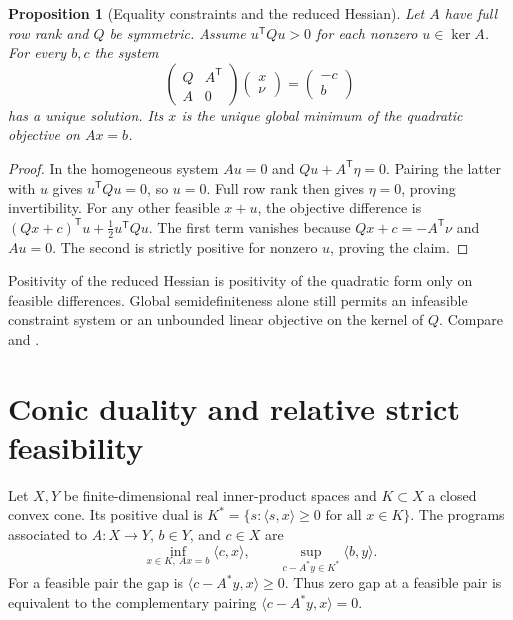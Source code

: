 \documentclass[11pt,oneside,openany]{book}
\theoremstyle{plain}
\newtheorem{proposition}[theorem]{Proposition}
\theoremstyle{definition}
\theoremstyle{remark}
\begin{document}
\begin{proposition}[Equality constraints and the reduced Hessian]\label{prop:reduced-hessian}
Let \(A\) have full row rank and \(Q\) be symmetric.
Assume \(u^{\mathsf T}Qu>0\) for each nonzero
\(u\in\ker A\). For every \(b,c\) the system
\[
 \begin{pmatrix}Q&A^{\mathsf T}\\ A&0\end{pmatrix}
 \begin{pmatrix}x\\ \nu\end{pmatrix}
 =
 \begin{pmatrix}-c\\ b\end{pmatrix}
\]
has a unique solution. Its \(x\) is the unique global
minimum of the quadratic objective on \(Ax=b\).
\end{proposition}

\begin{proof}
In the homogeneous system \(Au=0\) and
\(Qu+A^{\mathsf T}\eta=0\). Pairing the latter with \(u\)
gives \(u^{\mathsf T}Qu=0\), so \(u=0\). Full row rank
then gives \(\eta=0\), proving invertibility.
For any other feasible \(x+u\), the objective difference
is \((Qx+c)^{\mathsf T}u+\tfrac12u^{\mathsf T}Qu\).
The first term vanishes because \(Qx+c=-A^{\mathsf T}\nu\)
and \(Au=0\). The second is strictly positive for
nonzero \(u\), proving the claim.
\end{proof}

Positivity of the reduced Hessian is positivity of the
quadratic form only on feasible differences.
Global semidefiniteness alone still permits an infeasible
constraint system or an unbounded linear objective on
the kernel of \(Q\). Compare
\cite[Sections 16.1 and 16.3]{NocedalWright} and
\cite[Section 4.4]{Boyd}.

\section{Conic duality and relative strict feasibility}
\label{v05-03}

Let \(X,Y\) be finite-dimensional real inner-product
spaces and \(K\subset X\) a closed convex cone.
Its positive dual is
\(K^*=\{s:\langle s,x\rangle\ge0\text{ for all }x\in K\}\).
The programs associated to \(A:X\to Y\), \(b\in Y\),
and \(c\in X\) are
\begin{equation}\label{eq:conic-primal-dual}
 \inf_{x\in K,\ Ax=b}\langle c,x\rangle,\qquad
 \sup_{c-A^*y\in K^*}\langle b,y\rangle .
\end{equation}
For a feasible pair the gap is
\(\langle c-A^*y,x\rangle\ge0\).
Thus zero gap at a feasible pair is equivalent to
the complementary pairing \(\langle c-A^*y,x\rangle=0\).
\end{document}
